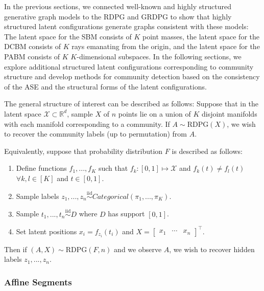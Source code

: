 \documentclass[
  11pt,
]{article}
\providecommand{\tightlist}{%
  \setlength{\itemsep}{0pt}\setlength{\parskip}{0pt}}
\begin{document}
In the previous sections, we connected well-known and highly structured
generative graph models to the RDPG and GRDPG to show that highly
structured latent configurations generate graphs consistent with these
models: The latent space for the SBM consists of \(K\) point masses, the
latent space for the DCBM consists of \(K\) rays emanating from the
origin, and the latent space for the PABM consists of \(K\)
\(K\)-dimensional subspaces. In the following sections, we explore
additional structured latent configurations corresponding to community
structure and develop methods for community detection based on the
consistency of the ASE and the structural forms of the latent
configurations.

The general structure of interest can be described as follows: Suppose
that in the latent space \(\mathcal{X} \subset \mathbb{R}^d\), sample
\(X\) of \(n\) points lie on a union of \(K\) disjoint manifolds with
each manifold corresponding to a community. If
\(A \sim \text{RDPG}(X)\), we wish to recover the community labels (up
to permutation) from \(A\).

Equivalently, suppose that probability distribution \(F\) is described
as follows:

\begin{enumerate}
\def\labelenumi{\arabic{enumi}.}
\tightlist
\item
  Define functions \(f_1, ..., f_K\) such that
  \(f_k : [0, 1] \mapsto \mathcal{X}\) and \(f_k(t) \neq f_l(t)\)
  \(\forall k, l \in [K]\) and \(t \in [0, 1]\).
\item
  Sample labels
  \(z_1, ..., z_n \stackrel{\text{iid}}{\sim}Categorical(\pi_1, ..., \pi_K)\).
\item
  Sample \(t_1, ..., t_n \stackrel{\text{iid}}{\sim}D\) where \(D\) has
  support \([0, 1]\).
\item
  Set latent positions \(x_i = f_{z_i}(t_i)\) and
  \(X = \begin{bmatrix} x_1 & \cdots & x_n \end{bmatrix}^\top\).
\end{enumerate}

Then if \((A, X) \sim \text{RDPG}(F, n)\) and we observe \(A\), we wish
to recover hidden labels \(z_1, ..., z_n\).

\hypertarget{affine-segments}{%
\subsubsection{Affine Segments}\label{affine-segments}}
\end{document}
